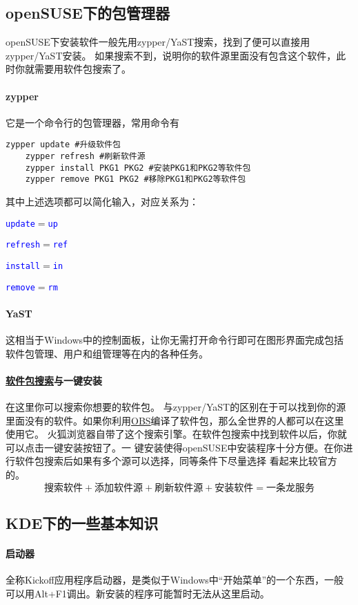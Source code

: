 \documentclass[10pt,openany]{book}
\newcommand{\command}[1]{\texttt{\textcolor{blue}{#1}}}
\newcommand{\simp}[2]{\command{#1}$=$\command{#2}}
\begin{document}
\subsection[包管理器]{openSUSE下的包管理器}
openSUSE下安装软件一般先用zypper/YaST搜索，找到了便可以直接用zypper/YaST安装。
如果搜索不到，说明你的软件源里面没有包含这个软件，此时你就需要用软件包搜索了。
\paragraph{zypper}\label{pre} 它是一个命令行的包管理器，常用命令有
\begin{Verbatim}[formatcom=\color{codecolor}]
    zypper update #升级软件包
    zypper refresh #刷新软件源
    zypper install PKG1 PKG2 #安装PKG1和PKG2等软件包
    zypper remove PKG1 PKG2 #移除PKG1和PKG2等软件包
\end{Verbatim}
其中上述选项都可以简化输入，对应关系为：\begin{inparaitem}
 \item \simp{update}{up}
 \item \simp{refresh}{ref}
 \item \simp{install}{in}
 \item \simp{remove}{rm}
\end{inparaitem}
\paragraph{YaST} 这相当于Windows中的控制面板，让你无需打开命令行即可在图形界面完成包括软件包管理、用户和组管理等在内的各种任务。
\paragraph[软件包搜索与一键安装]{\href{http://software.opensuse.org/packages}{软件包搜索}与一键安装} 在这里你可以搜索你想要的软件包。
与zypper/YaST的区别在于可以找到你的源里面没有的软件。如果你利用\href{https://build.opensuse.org/}{OBS}编译了软件包，那么全世界的人都可以在这里使用它。
火狐浏览器自带了这个搜索引擎。在软件包搜索中找到软件以后，你就可以点击一键安装按钮了。一
键安装使得openSUSE中安装程序十分方便。在你进行软件包搜索后如果有多个源可以选择，同等条件下尽量选择
看起来比较官方的。\[\text{搜索软件}+\text{添加软件源}+\text{刷新软件源}+\text{安装软件}=\text{一条龙服务}\]
\subsection{KDE下的一些基本知识}
\paragraph{启动器} 全称Kickoff应用程序启动器，是类似于Windows中“开始菜单”的一个东西，一般可以用Alt+F1调出。新安装的程序可能暂时无法从这里启动。
\end{document}
